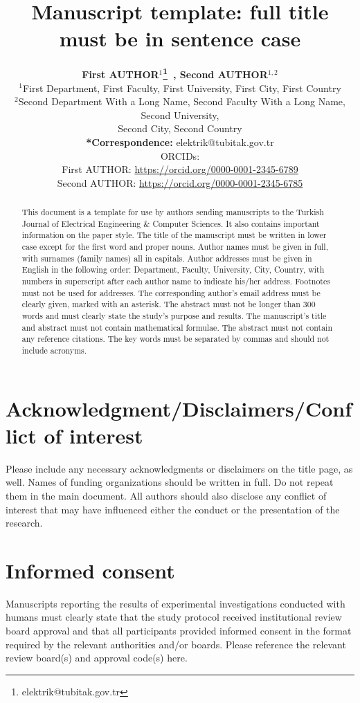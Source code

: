 \documentclass{elektr}
\title{Manuscript template: full title must be in sentence case}
\author[AUTHOR and AUTHOR]{
	\textbf{First AUTHOR$^{1}$\thanks{elektrik@tubitak.gov.tr}~, Second AUTHOR$^{1,2}$}\\
	$^{1}$First Department, First Faculty, First University, First City, First Country\\
	$^{2}$Second Department With a Long Name, Second Faculty With a Long Name, Second University,\\ Second City, Second Country
	\\ [1.8em]
	
	\textbf{*Correspondence:} elektrik@tubitak.gov.tr \\
	ORCIDs:\\
	First AUTHOR: \url{https://orcid.org/0000-0001-2345-6789} \\
	Second AUTHOR: \url{https://orcid.org/0000-0001-2345-6785} \\
	
}
\begin{document}
	
	\maketitle
	
	
	\begin{abstract}
		This document is a template for use by authors sending manuscripts to the Turkish Journal of Electrical Engineering {\&} Computer Sciences. It also contains important information on the paper style. The title of the manuscript must be written in lower case except for the first word and proper nouns. Author names must be given in full, with surnames (family names) all in capitals. Author addresses must be given in English in the following order: Department, Faculty, University, City, Country, with numbers in superscript after each author name to indicate his/her address. Footnotes must not be used for addresses. The corresponding author's email address must be clearly given, marked with an asterisk. The abstract must not be longer than 300 words and must clearly state the study's purpose and results. The manuscript's title and abstract must not contain mathematical formulae. The abstract must not contain any reference citations. The key words must be separated by commas and should not include acronyms.
		
	\end{abstract}
	
	\section*{Acknowledgment/Disclaimers/Conflict of interest}
	Please include any necessary acknowledgments or disclaimers on the title page, as well. Names of funding organizations should be written in full. Do not repeat them in the main document.
	All authors should also disclose any conflict of interest that may have influenced either the conduct or the presentation of the research.
	
	\section*{Informed consent}
	Manuscripts reporting the results of experimental investigations conducted with humans must clearly state that the study protocol received institutional review board approval and that all participants provided informed consent in the format required by the relevant authorities and/or boards. Please reference the relevant review board(s) and approval code(s) here.
\end{document}
